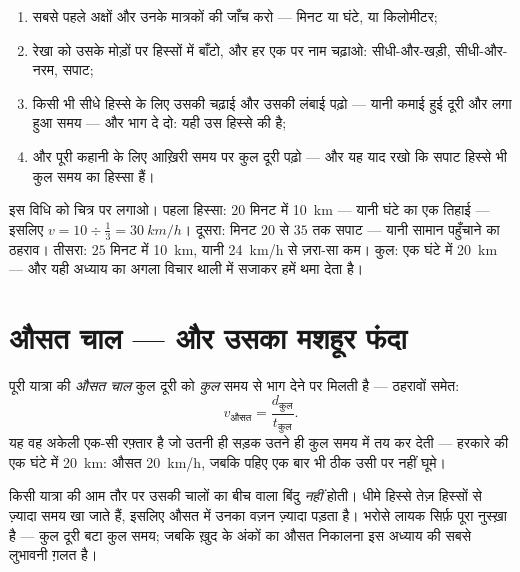 \begin{method}[दूरी--समय आलेख पढ़ना]\label{met:g7:motion-average-speed:read}
\begin{enumerate}
  \item सबसे पहले अक्षों और उनके मात्रकों की जाँच करो --- मिनट या
        घंटे,  या किलोमीटर;
  \item रेखा को उसके मोड़ों पर हिस्सों में बाँटो, और हर एक पर नाम
        चढ़ाओ: सीधी-और-खड़ी, सीधी-और-नरम, सपाट;
  \item किसी भी सीधे हिस्से के लिए उसकी चढ़ाई और उसकी लंबाई पढ़ो ---
        यानी कमाई हुई दूरी और लगा हुआ समय --- और भाग दे दो: यही उस
        हिस्से की  है;
  \item और पूरी कहानी के लिए आख़िरी समय पर कुल दूरी पढ़ो --- और यह
        याद रखो कि सपाट हिस्से भी कुल समय का हिस्सा हैं।
\end{enumerate}
\end{method}

\begin{example}[हरकारा, खोला हुआ]\label{ex:g7:motion-average-speed:decoded}
इस विधि को चित्र पर लगाओ। पहला हिस्सा: $20$ मिनट में \qty{10}{km} ---
यानी घंटे का एक तिहाई --- इसलिए $v = 10 \div \tfrac{1}{3} =
\qty{30}{km/h}$। दूसरा: मिनट $20$ से $35$ तक सपाट --- यानी सामान
पहुँचाने का ठहराव। तीसरा: $25$ मिनट में \qty{10}{km}, यानी
\qty{24}{km/h} से ज़रा-सा कम। कुल: एक घंटे में \qty{20}{km} --- और यही
अध्याय का अगला विचार थाली में सजाकर हमें थमा देता है।
\end{example}

\section{औसत चाल --- और उसका मशहूर फंदा}

\begin{definition}[औसत चाल]\label{def:g7:motion-average-speed:average}
पूरी यात्रा की \emph{औसत चाल} कुल दूरी को \emph{कुल}
समय से भाग देने पर मिलती है --- ठहरावों समेत:
\[
v_{\text{औसत}} = \frac{d_{\text{कुल}}}{t_{\text{कुल}}}.
\]
यह वह अकेली एक-सी रफ़्तार है जो उतनी ही सड़क उतने ही कुल समय में तय कर
देती --- हरकारे की एक घंटे में \qty{20}{km}: औसत \qty{20}{km/h}, जबकि
पहिए एक बार भी ठीक उसी  पर नहीं घूमे।
\end{definition}

\begin{proposition}[फंदा]\label{prop:g7:motion-average-speed:trap}
किसी यात्रा की  आम तौर पर उसकी चालों का बीच वाला बिंदु
\emph{नहीं} होती। धीमे हिस्से तेज़ हिस्सों से ज़्यादा समय खा जाते हैं,
इसलिए औसत में उनका वज़न ज़्यादा पड़ता है। भरोसे लायक सिर्फ़ पूरा
नुस्ख़ा है --- कुल दूरी बटा कुल समय; जबकि ख़ुद  के अंकों का औसत
निकालना इस अध्याय की सबसे लुभावनी ग़लत  है।
\end{proposition}

